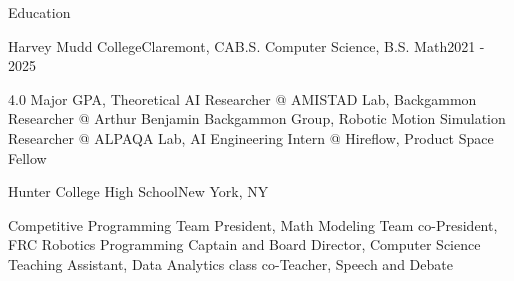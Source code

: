 \documentclass{ForrestBickerResume}
\begin{document}
\vspace{0.2em}


\vspace{-0.5ex}
\begin{rSection}{Education}
    \begin{rSubsection}{Harvey Mudd College}{Claremont, CA}{B.S. Computer Science, B.S. Math}{2021 - 2025}{}
        \item 4.0 Major GPA, Theoretical AI Researcher @ AMISTAD Lab, Backgammon Researcher @ Arthur Benjamin Backgammon Group, Robotic Motion Simulation Researcher @ ALPAQA Lab, AI Engineering Intern @ Hireflow, Product Space Fellow
    \end{rSubsection}
    \begin{rSubsection}{Hunter College High School}{New York, NY}{}{}{}
        \vspace{-12px}
        \item Competitive Programming Team President, Math Modeling Team co-President, FRC Robotics Programming Captain and Board Director, Computer Science Teaching Assistant, Data Analytics class co-Teacher, Speech and Debate
    \end{rSubsection}
\end{rSection}
\end{document}

